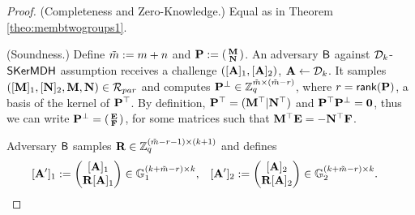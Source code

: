 \begin{proof} (Completeness and Zero-Knowledge.) Equal as in Theorem \ref{theo:membtwogroups1}.

(Soundness.)
Define $\tilde{m}:=m+n$ and $\mathbf{{P}}:=\left(\begin{smallmatrix}\mathbf{{M}}\\\mathbf{{N}}\end{smallmatrix}\right)$. 
An adversary $\mathsf{B}$ against  
$\mathcal{D}_{k}$-$\mathsf{SKerMDH}$ assumption receives a challenge $([\mathbf{{A}}]_1,[\mathbf{{A}}]_2)$, $\mathbf{{A}} \gets \mathcal{D}_k$. 
It samples 
$([\mathbf{{M}}]_1,[\mathbf{{N}}]_2,\mathbf{{M}},\mathbf{{N}}) \in \mathcal{R}_{par}$ and computes  $\mathbf{{P}}^{\perp} \in \mathbb{Z}_q^{\tilde{m} \times (\tilde{m}-r)}$, where $r=\mathsf{rank}(\mathbf{{P}})$, a basis of the kernel of $\mathbf{{P}}^{\top}$. 
By definition, $\mathbf{{P}}^{\top}=(\mathbf{{M}}^{\top} |\mathbf{{N}}^{\top})$ and $\mathbf{{P}}^{\top}\mathbf{{P}}^{\perp} =\mathbf{{0}}$, thus we can write $\mathbf{{P}}^{\perp}= \left(\begin{smallmatrix}\mathbf{{E}} \\ \mathbf{{F}}\end{smallmatrix}\right)$, for some matrices such that $\mathbf{{M}}^{\top}\mathbf{{E}}=-\mathbf{{N}}^{\top} \mathbf{{F}}$.

Adversary $\mathsf{B}$ samples 
$\mathbf{{R}} \in \mathbb{Z}_q^{(\tilde{m}-r-1) \times (k+1)}$ and defines 
\begin{align*}
&[\mathbf{{A}}']_1:=\begin{pmatrix} [\mathbf{{A}}]_1 \\ \mathbf{{R}} [\mathbf{{A}}]_1 \end{pmatrix} \in \mathbb{G}_1^{(k+\tilde{m}-r) \times k},&
&[\mathbf{{A}}']_2:=\begin{pmatrix} [\mathbf{{A}}]_2 \\ \mathbf{{R}} [\mathbf{{A}}]_2 \end{pmatrix} \in \mathbb{G}_2^{(k+\tilde{m}-r) \times k}.
\end{align*} 


\end{proof}

